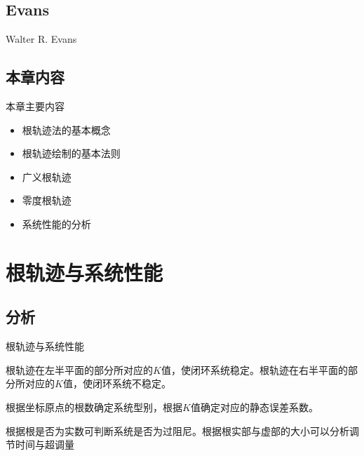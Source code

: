 \subsection{Evans}
\begin{frame}{Walter R. Evans}
\begin{center}
\end{center}
\end{frame}

\subsection{本章内容}
\begin{frame}{本章主要内容}
\begin{itemize}
\item<2-> 根轨迹法的基本概念
\item<3-> 根轨迹绘制的基本法则
\item<4-> 广义根轨迹
\item<5-> 零度根轨迹
\item<6-> 系统性能的分析
\end{itemize}
\end{frame}

\section{根轨迹与系统性能}
\subsection{分析}
\begin{frame}{根轨迹与系统性能}
\begin{description}
\item<2->[稳定性：] 根轨迹在左半平面的部分所对应的$K$值，使闭环系统稳定。根轨迹在右半平面的部分所对应的$K$值，使闭环系统不稳定。
\item<3->[稳态性能：] 根据坐标原点的根数确定系统型别，根据$K$值确定对应的静态误差系数。
\item<4->[动态性能：] 根据根是否为实数可判断系统是否为过阻尼。根据根实部与虚部的大小可以分析调节时间与超调量
\end{description}
\end{frame}

